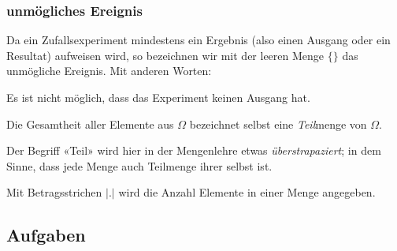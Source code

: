\subsubsection{unmögliches Ereignis}
Da ein Zufallsexperiment mindestens ein Ergebnis (also einen Ausgang
oder ein Resultat) aufweisen wird, so bezeichnen wir mit der leeren
Menge $\{\}$ das unmögliche Ereignis. Mit anderen Worten:

Es ist nicht möglich, dass das Experiment keinen Ausgang hat.


\begin{bemerkung}{}{}
Die Gesamtheit aller Elemente aus $\Omega$ bezeichnet selbst eine
\textit{Teil}menge von $\Omega$.

Der Begriff «Teil» wird hier in der Mengenlehre etwas \textit{überstrapaziert}; in dem Sinne, dass jede Menge auch
  Teilmenge ihrer selbst ist.
\end{bemerkung}

\begin{definition}{}{}
Mit Betragsstrichen $|.|$ wird die Anzahl Elemente in einer Menge angegeben.
\end{definition}

\subsection*{Aufgaben}

\newpage
